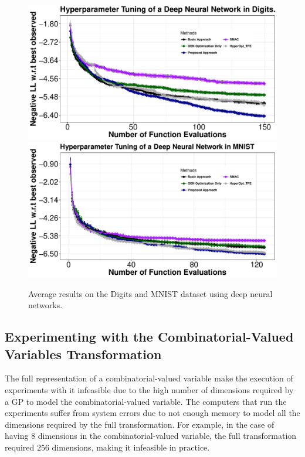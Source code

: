 \begin{figure}[htb]
        \begin{center}
        \includegraphics[width=0.7\linewidth]{Figures/integer/real/rrnn_digits_final_ok.pdf} \\
        \includegraphics[width=0.7\linewidth]{Figures/integer/real/rrnn_final_ok.pdf} \\
        \end{center}
\caption{{\small Average results on the Digits and MNIST dataset using deep neural networks.}}
\label{fig:results_deep}
\end{figure}

\subsection{Experimenting with the Combinatorial-Valued Variables Transformation}
The full representation of a combinatorial-valued variable make the execution of experiments with it infeasible due to the high number of dimensions required by a GP to model the combinatorial-valued variable. The computers that run the experiments suffer from system errors due to not enough memory to model all the dimensions required by the full transformation. For example, in the case of having $8$ dimensions in the combinatorial-valued variable, the full transformation required $256$ dimensions, making it infeasible in practice.

